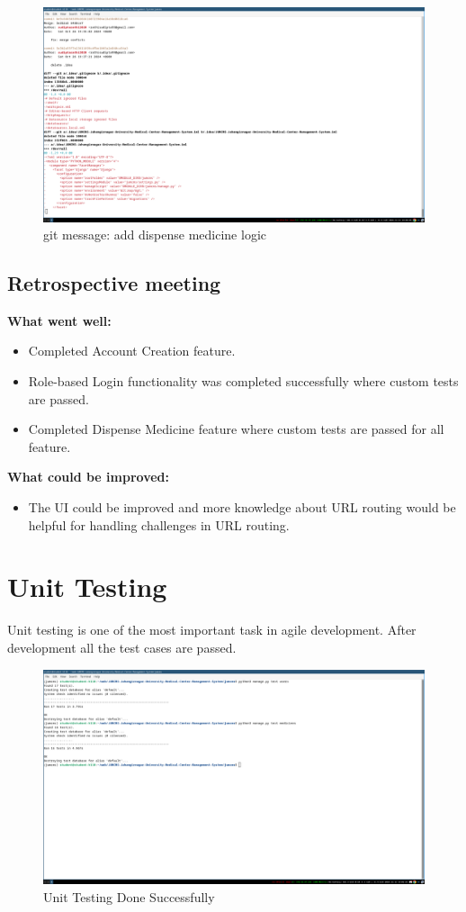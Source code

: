 \documentclass[a4paper,12pt]{article}
\begin{document}
\begin{figure}[H]
    \centering
    \includegraphics[width=\textwidth]{spr1meet39.png}
    \caption{git message: add dispense medicine logic}
\end{figure}
\newpage
\subsection{Retrospective meeting}
\textbf{What went well:}
\begin{itemize}
    \item Completed Account Creation feature.
    \item Role-based Login functionality was completed successfully where custom tests are passed.
    \item Completed Dispense Medicine feature where custom tests are passed for all feature.
\end{itemize}
\textbf{What could be improved:}
\begin{itemize}
    \item The UI could be improved and more knowledge about URL routing would be helpful for handling challenges in URL routing.
\end{itemize}
\newpage

\section{Unit Testing}
Unit testing is one of the most important task in agile development. After development all the test cases are
passed.
\begin{figure}[H]
    \centering
    \includegraphics[width=\textwidth]{unittesting.png}
    \caption{Unit Testing Done Successfully}
\end{figure}
\newpage
\end{document}

